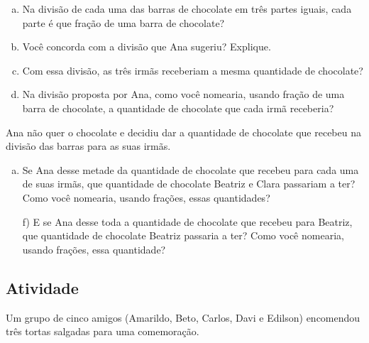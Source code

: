 \begin{enumerate}[a)] %
  \item Na divisão de cada uma das barras de chocolate em três partes iguais, cada parte é que fração de uma barra de chocolate?
  \item Você concorda com a divisão que Ana sugeriu? Explique. 
  \item Com essa divisão, as três irmãs receberiam a mesma quantidade de chocolate? 
  \item Na divisão proposta por Ana, como você nomearia, usando fração de uma barra de chocolate, a quantidade de chocolate que cada irmã receberia? 
\end{enumerate}
  
Ana não quer o chocolate e decidiu dar a quantidade de chocolate que recebeu na divisão das barras para as suas irmãs.

\begin{enumerate}[e)]
\item Se Ana desse metade da quantidade de chocolate que recebeu para cada uma de suas irmãs, que quantidade de chocolate Beatriz e Clara passariam a ter? Como você nomearia, usando frações, essas quantidades?  
\item[f)] E se Ana desse toda a quantidade de chocolate que recebeu para Beatriz, que quantidade de chocolate  Beatriz passaria a ter? Como você nomearia, usando frações, essa quantidade?
\end{enumerate} %


\subsection{Atividade}

Um grupo de cinco amigos (Amarildo, Beto, Carlos, Davi e Edilson) encomendou três tortas salgadas para uma comemoração.

\begin{center}
  
\end{center}
 
